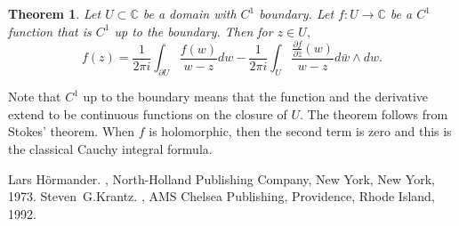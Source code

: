 \documentclass[12pt]{article}
\theoremstyle{theorem}
\newtheorem*{thm}{Theorem}
\theoremstyle{definition}
\theoremstyle{remark}
\begin{document}
\begin{thm}
Let $U \subset \mathbb{C}$ be a domain with $C^1$ boundary.  Let $f \colon U \to \mathbb{C}$
be a $C^1$ function that is $C^1$ up to the boundary.  Then for $z \in U,$
\begin{equation*}
f(z) =
\frac{1}{2\pi i}
\int_{\partial U} \frac{f(w)}{w-z} dw
-
\frac{1}{2\pi i}
\int_{U} \frac{\frac{\partial f}{\partial \bar{z}}(w)}{w-z} d\bar{w} \wedge dw .
\end{equation*}
\end{thm}

Note that $C^1$ up to the boundary means that the function and the derivative extend to be continuous
functions on the closure of $U.$  The theorem follows from Stokes' theorem.  When $f$ is holomorphic,
then the second term is zero and this is the classical Cauchy integral formula.

\begin{thebibliography}{9}
Lars H\"ormander.
{\em {}},
North-Holland Publishing Company, New York, New York, 1973.
Steven~G.\@ Krantz.
{\em {}},
AMS Chelsea Publishing, Providence, Rhode Island, 1992.
\end{thebibliography}
\end{document}

